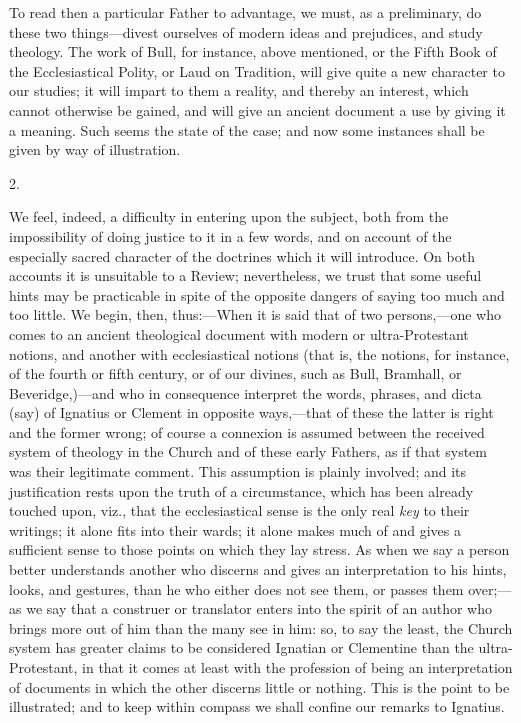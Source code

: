 To read then a particular Father to advantage, we
must, as a preliminary, do these two things—divest ourselves of
modern ideas and prejudices, and study theology. The work of Bull, for
instance, above mentioned, or the Fifth Book of the Ecclesiastical
Polity, or Laud on Tradition, will give quite a new character to
our studies; it will impart to them a reality, and thereby an
interest, which cannot otherwise be gained, and will give an ancient
document a use by giving it a meaning. Such seems the state of the
case; and now some instances shall be given by way of illustration.

2.

We feel, indeed, a difficulty in entering upon
the subject, both from the impossibility of doing justice to it in a
few words, and on account of the especially sacred character of the
doctrines which it will introduce. On both accounts it is unsuitable
to a Review; nevertheless, we trust that some useful hints may be
practicable in spite of the opposite dangers of saying too much and
too little. We begin, then, thus:—When it is said that of two
persons,—one who comes to an ancient theological document with
modern or ultra-Protestant notions, and another with ecclesiastical
notions (that is, the notions, for instance, of the fourth or fifth
century, or of our divines, such as Bull, Bramhall, or Beveridge,)—and
who in consequence interpret the words, phrases, and dicta (say) of
Ignatius or Clement in opposite ways,—that of these the latter is
right and the former wrong; of course a connexion is assumed between
the received system of theology in the Church and of these early
Fathers, as if that system was their legitimate comment. This
assumption is plainly involved; and its justification rests upon the
truth of a circumstance, which has been already touched upon, viz.,
that the ecclesiastical sense is the only real \emph{key} to their
writings; it alone fits into their wards; it alone makes much of and
gives a sufficient sense to those points on which they lay stress. As
when we say a person better understands another who discerns and
gives an interpretation to his hints, looks, and gestures, than he who
either does not see them, or passes them over;—as we say that a
construer or translator enters into the spirit of an author who brings
more out of him than the many see in him: so, to say the least, the
Church system has greater claims to be considered Ignatian or
Clementine than the ultra-Protestant, in that it comes at least with
the profession of being an interpretation of documents in which the
other discerns little or nothing. This is the point to be illustrated;
and to keep within compass we shall confine our remarks to Ignatius.

